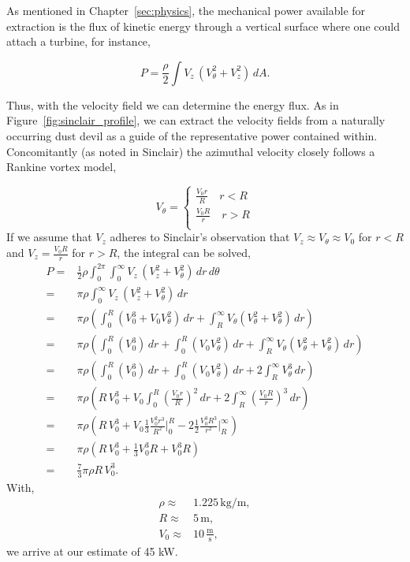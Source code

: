 \label{scaling}

As mentioned in Chapter~\ref{sec:physics}, the mechanical power
available for extraction is the flux of kinetic energy through a
vertical surface where one could attach a turbine, for instance, 

\begin{equation}
 P = \frac{\rho }{2} \int V_z \, (V_{\theta}^2 + V_z^2 ) \, dA. 
\end{equation}

Thus, with the velocity field we can determine the energy
flux. As in Figure~\ref{fig:sinclair_profile}, we can extract the
velocity fields from a naturally occurring dust devil as a guide of the 
representative power contained within. Concomitantly (as noted in
Sinclair) the azimuthal velocity closely follows a Rankine vortex model,   

\begin{equation}
 V_{\theta} = 
  \begin{cases}
   \frac{V_0 r}{R} \quad r < R \\
   \frac{V_0 R}{r} \quad r > R \\
  \end{cases}
\end{equation}
%
If we assume that $V_z$ adheres to Sinclair's observation that $V_z \approx
V_{\theta} \approx V_0$ for $r < R$ and $V_z=\frac{V_0 R}{r}$ for $r > R$,
the integral can be solved, 
\begin{eqnarray}
 P =& \frac{1}{2} \rho \int_0^{2\pi}\int_0^{\infty} V_z \, (V^2_z +
  V_{\theta}^2)\, dr \, d\theta \\ 
 =& \pi \rho \int_0^{\infty} V_z \, (V^2_z + V_{\theta}^2)\, dr \\
 =& \pi \rho \left( \int_0^R (V_0^3 + V_0 V_{\theta}^2)\,dr +
	      \int_R^{\infty} V_{\theta} (V_{\theta}^2 + V_{\theta}^2)\,dr 
	     \right) \\
 =& \pi \rho \left( \int_0^R (V_0^3)\, dr + \int_0^R (V_0 V_{\theta}^2)\,dr +
	      \int_R^{\infty} V_{\theta} (V_{\theta}^2 + V_{\theta}^2) \,dr 
		     \right) \\
 =& \pi \rho \left( \int_0^R (V_0^3)\, dr + \int_0^R (V_0 V_{\theta}^2)\,dr +
	      2 \int_R^{\infty} V_{\theta}^3 \,dr 
		     \right) \\
 =& \pi \rho \left( R\, V_0^3 + V_0 \int_0^R (\frac{V_0 r}{R})^2\,dr +
	      2 \int_R^{\infty} (\frac{V_0 R}{r})^3 \,dr 
		     \right) \\
 =& \pi \rho \left( R\, V_0^3 + V_0 \frac{1}{3} \frac{V_0^2 r^3}{R^2}\rvert_0^R -
	      2 \frac{1}{2} \frac{V_0^3 R^3}{r^2}\rvert_R^{\infty}
		      \right) \\
 =& \pi \rho \left( R\, V_0^3 + \frac{1}{3} V_0^3 R + V_0^3 R \right)\\
 =& \frac{7}{3}\pi \rho R\, V_0^3.
\end{eqnarray}
%
%
%
%
With, 
\begin{eqnarray}
 \rho \approx& 1.225 \,\text{kg}/\text{m}, \\
 R \approx& 5 \,\text{m}, \\
 V_0 \approx& 10 \,\frac{\text{m}}{\text{s}},
\end{eqnarray}
we arrive at our estimate of 45 kW.

%
%